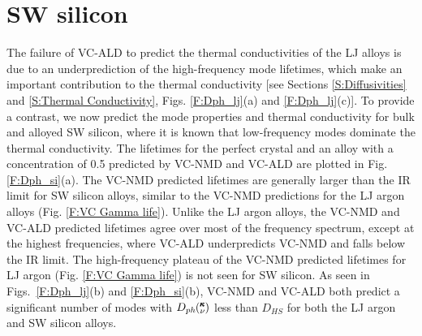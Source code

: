 \documentclass[12pt,twocolumn,iop]{/usr/share/texmf-texlive/tex/latex/iop/iopart}[/usr/share/texmf-texlive/tex/latex/iop/]
\newcommand{\kv}{\mspace{-4.0mu}\left(\mspace{-8.0mu}
\begin{smallmatrix}&\pmb{\kappa} \\&\nu\end{smallmatrix}
\mspace{-3.0mu}\right)}
\begin{document}

\clearpage

\section{\label{S:SW}SW silicon}

The failure of VC-ALD to predict the thermal conductivities of the LJ 
alloys is due to an underprediction of the high-frequency mode lifetimes, 
which make an important contribution to the thermal conductivity 
[see Sections \ref{S:Diffusivities} and \ref{S:Thermal Conductivity}, 
Figs. \ref{F:Dph_lj}(a) and \ref{F:Dph_lj}(c)]. To provide a contrast, 
we now predict the mode properties and thermal conductivity for bulk 
and alloyed SW silicon, where it is known that low-frequency modes 
dominate the thermal conductivity.
\cite{sellan_size_2010,sellan_cross-plane_2010} 
The lifetimes for the perfect crystal and an alloy with a concentration of 
0.5 predicted by VC-NMD and VC-ALD are plotted in Fig. \ref{F:Dph_si}(a). 
The VC-NMD predicted lifetimes are generally larger than 
the IR limit for SW silicon alloys, similar 
to the VC-NMD predictions for the LJ argon alloys 
(Fig. \ref{F:VC Gamma life}). Unlike the 
LJ argon alloys, the  
VC-NMD and VC-ALD predicted lifetimes agree over most 
of the frequency spectrum, except at the highest frequencies, where 
VC-ALD underpredicts VC-NMD and falls below the IR limit. 
The high-frequency plateau of the VC-NMD predicted lifetimes 
for LJ argon (Fig. \ref{F:VC Gamma life}) is not seen for SW silicon. 
As seen in Figs.~\ref{F:Dph_lj}(b) 
and \ref{F:Dph_si}(b), VC-NMD and VC-ALD both predict a significant 
number of modes with  
$D_{ph}\kv$ less than $D_{HS}$ for both the LJ argon and 
SW silicon alloys. 
\end{document}
